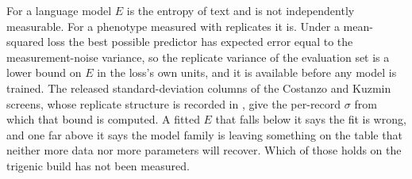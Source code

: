 For a language model $E$ is the entropy of text and is not independently
measurable. For a phenotype measured with replicates it is. Under a mean-squared
loss the best possible predictor has expected error equal to the measurement-noise
variance, so the replicate variance of the evaluation set is a lower bound on $E$
in the loss's own units, and it is available before any model is trained. The
released standard-deviation columns of the Costanzo and Kuzmin screens, whose
replicate structure is recorded in
,
give the per-record $\sigma$ from which that bound is computed. A fitted $E$ that
falls below it says the fit is wrong, and one far above it says the model family
is leaving something on the table that neither more data nor more parameters will
recover. Which of those holds on the trigenic build has not been measured.
